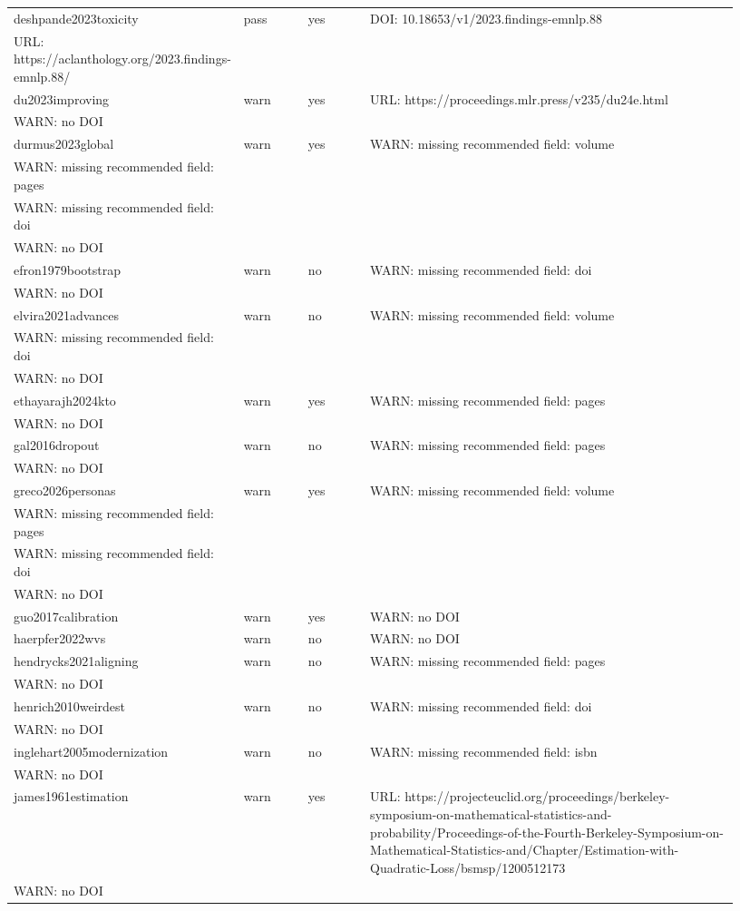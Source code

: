 \documentclass[11pt]{article}
\begin{document}
\begin{longtable}{p{0.18\linewidth}p{0.1\linewidth}p{0.1\linewidth}p{0.55\linewidth}}
deshpande2023toxicity & pass & yes & DOI: 10.18653/v1/2023.findings-emnlp.88 \\ URL: https://aclanthology.org/2023.findings-emnlp.88/ \\
du2023improving & warn & yes & URL: https://proceedings.mlr.press/v235/du24e.html \\ WARN: no DOI \\
durmus2023global & warn & yes & WARN: missing recommended field: volume \\ WARN: missing recommended field: pages \\ WARN: missing recommended field: doi \\ WARN: no DOI \\
efron1979bootstrap & warn & no & WARN: missing recommended field: doi \\ WARN: no DOI \\
elvira2021advances & warn & no & WARN: missing recommended field: volume \\ WARN: missing recommended field: doi \\ WARN: no DOI \\
ethayarajh2024kto & warn & yes & WARN: missing recommended field: pages \\ WARN: no DOI \\
gal2016dropout & warn & no & WARN: missing recommended field: pages \\ WARN: no DOI \\
greco2026personas & warn & yes & WARN: missing recommended field: volume \\ WARN: missing recommended field: pages \\ WARN: missing recommended field: doi \\ WARN: no DOI \\
guo2017calibration & warn & yes & WARN: no DOI \\
haerpfer2022wvs & warn & no & WARN: no DOI \\
hendrycks2021aligning & warn & no & WARN: missing recommended field: pages \\ WARN: no DOI \\
henrich2010weirdest & warn & no & WARN: missing recommended field: doi \\ WARN: no DOI \\
inglehart2005modernization & warn & no & WARN: missing recommended field: isbn \\ WARN: no DOI \\
james1961estimation & warn & yes & URL: https://projecteuclid.org/proceedings/berkeley-symposium-on-mathematical-statistics-and-probability/Proceedings-of-the-Fourth-Berkeley-Symposium-on-Mathematical-Statistics-and/Chapter/Estimation-with-Quadratic-Loss/bsmsp/1200512173 \\ WARN: no DOI \\

\end{longtable}
\end{document}

